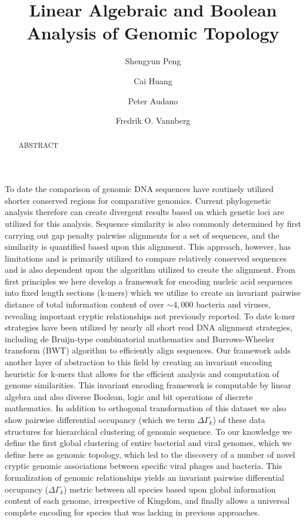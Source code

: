\documentclass[12pt]{article}
\title{Linear Algebraic and Boolean Analysis of Genomic Topology}
\author[1]{Shengyun Peng}
\author[1]{Cai Huang}
\author[1]{Peter Audano}
\author[1]{Fredrik O. Vannberg}
\affil[1]{Parker H. Petit Institute for Bioengineering and Biosciences, School of Biology, Georgia Institute of Technology, Atlanta, Georgia 30332, USA}
\date{}
\begin{document}
\maketitle

\begin{abstract}   
ABSTRACT 
\end{abstract}
To date the comparison of genomic DNA sequences\cite{Pruitt:2005aa} have routinely utilized shorter conserved regions for comparative genomics. Current phylogenetic analysis therefore can create divergent results based on which genetic loci are utilized for this analysis\cite{Salichos:2013aa}. Sequence similarity is also commonly determined by first carrying out gap penalty pairwise alignments\cite{Altschul:1990aa}\cite{Vingron:1994aa}\cite{Morgenstern:1996aa} for a set of sequences, and the similarity is quantified based upon this alignment. This approach, however, has limitations and is primarily utilized to compare relatively conserved sequences and is also dependent upon the algorithm utilized to create the alignment.  From first principles we here develop a framework for encoding nucleic acid sequences into fixed length sections (k-mers)\cite{Chor:2009aa}\cite{Grabherr:2011aa} which we utilize to create an invariant pairwise distance of total information content of over $\sim4,000$ bacteria\cite{Doolittle:2002aa} and viruses, revealing important cryptic relationships not previously reported. To date k-mer strategies have been utilized by nearly all short read DNA alignment strategies, including de Bruijn-type\cite{Compeau:2011aa} combinatorial mathematics and Burrows-Wheeler transform\cite{Adjeroh:2002aa} (BWT) algorithm to efficiently align sequences. Our framework adds another layer of abstraction to this field by creating an invariant encoding heuristic for k-mers that allows for the efficient analysis and computation of genome similarities. This invariant encoding framework is computable by linear algebra and also diverse Boolean, logic and bit operations of discrete mathematics. In addition to orthogonal transformation of this dataset we also show pairwise differential occupancy (which we term $\Delta {\Gamma _k}$) of these data structures for hierarchical clustering of genomic sequence. To our knowledge we define the first global clustering of entire bacterial and viral genomes, which we define here as genomic topology, which led to the discovery of a number of novel cryptic genomic associations between specific viral phages\cite{Sampson:2009aa} and bacteria. This formalization of genomic relationships yields an invariant pairwise differential occupancy ($\Delta {\Gamma _k}$) metric between all species based upon global information content of each genome, irrespective of Kingdom, and finally allows a universal complete encoding for species that was lacking in previous approaches. \\ 
\end{document}
